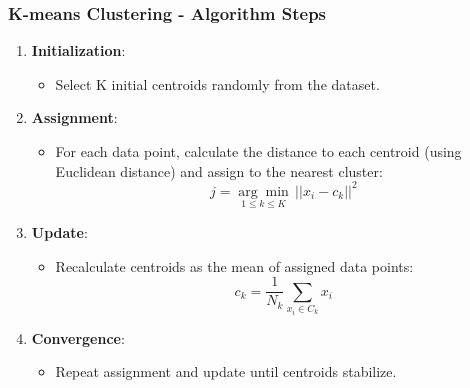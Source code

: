 \documentclass[aspectratio=169]{beamer}
\begin{document}
\begin{frame}[fragile]
    \frametitle{K-means Clustering - Algorithm Steps}
    \begin{enumerate}
        \item \textbf{Initialization}:
        \begin{itemize}
            \item Select K initial centroids randomly from the dataset.
        \end{itemize}
        \item \textbf{Assignment}:
        \begin{itemize}
            \item For each data point, calculate the distance to each centroid (using Euclidean distance) and assign to the nearest cluster:
            \[
            j = \underset{1 \leq k \leq K}{\arg \min} \, ||x_i - c_k||^2
            \]
        \end{itemize}
        \item \textbf{Update}:
        \begin{itemize}
            \item Recalculate centroids as the mean of assigned data points:
            \[
            c_k = \frac{1}{N_k} \sum_{x_i \in C_k} x_i
            \]
        \end{itemize}
        \item \textbf{Convergence}:
        \begin{itemize}
            \item Repeat assignment and update until centroids stabilize.
        \end{itemize}
    \end{enumerate}
\end{frame}
\end{document}
